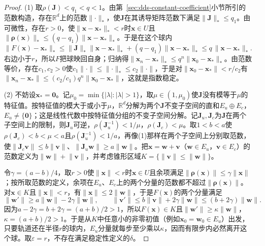 \begin{proof}
(1) 取$\rho(\bm J)<q_1<q<1$。由第~\ref{sec:dds-constant-coefficient}小节所引的范数构造，存在$\mathbb R^d$上的范数$\lVert\cdot\rVert_*$，使$\bm J$在其诱导矩阵范数下满足$\lVert\bm J\rVert_*\leq q_1$。由可微性，存在$r>0$，使$\lVert\bm x-\bm x_*\rVert_*<r$时$\bm x\in U$且$\lVert\bm\rho(\bm x)\rVert_*\leq(q-q_1)\lVert\bm x-\bm x_*\rVert_*$。于是在这个球内
\[
  \lVert F(\bm x)-\bm x_*\rVert_*\leq\lVert\bm J\rVert_*\lVert\bm x-\bm x_*\rVert_*+(q-q_1)\lVert\bm x-\bm x_*\rVert_*\leq q\,\lVert\bm x-\bm x_*\rVert_*.
\]
右边小于$r$，所以$F$把球映回自身；归纳得$\lVert\bm x_n-\bm x_*\rVert_*\leq q^n\lVert\bm x_0-\bm x_*\rVert_*$。由范数等价，存在$c_1,c_2>0$使$c_1\lVert\cdot\rVert\leq\lVert\cdot\rVert_*\leq c_2\lVert\cdot\rVert$，于是对$\lVert\bm x_0-\bm x_*\rVert<r/c_2$有$\lVert\bm x_n-\bm x_*\rVert\leq(c_2/c_1)q^n\lVert\bm x_0-\bm x_*\rVert$，这就是指数稳定。

(2) 不妨设$\bm x_*=\bm 0$。记$\mu_0=\min\{|\lambda|:|\lambda|>1\}$，取$\mu\in(1,\mu_0)$使$\bm J$没有模等于$\mu$的特征值。按特征值的模大于或小于$\mu$，$\mathbb R^d$分解为两个$\bm J$不变子空间的直和$E_u\oplus E_c$，$E_u\neq\{\bm 0\}$；这是线性代数中按特征值分组的不变子空间分解。记$\bm J_u,\bm J_c$为$\bm J$在两个子空间上的限制，则$\bm J_u$可逆，$\rho(\bm J_u^{-1})<1/\mu$，$\rho(\bm J_c)<\mu$。取$1<b<a$使$\rho(\bm J_c)<b<\mu<a$且$\rho(\bm J_u^{-1})<1/a$，再像(1)那样在两个子空间上分别取范数，使$\lVert\bm J_c\bm v\rVert\leq b\lVert\bm v\rVert$、$\lVert\bm J_u\bm w\rVert\geq a\lVert\bm w\rVert$。把$\bm x=\bm w+\bm v$（$\bm w\in E_u$，$\bm v\in E_c$）的范数定义为$\lVert\bm w\rVert+\lVert\bm v\rVert$，并考虑锥形区域$K=\{\lVert\bm v\rVert\leq\lVert\bm w\rVert\}$。

令$\gamma=(a-b)/4$，取$r>0$使$\lVert\bm x\rVert<r$时$\bm x\in U$且余项满足$\lVert\bm\rho(\bm x)\rVert\leq\gamma\lVert\bm x\rVert$；按所取范数的定义，余项在$E_u$、$E_c$上的两个分量的范数都不超过$\lVert\bm\rho(\bm x)\rVert$。对$\bm x\in K$且$\lVert\bm x\rVert<r$，有$\lVert\bm x\rVert\leq2\lVert\bm w\rVert$，于是$F(\bm x)$的两个分量满足
\[
  \lVert\bm w'\rVert\geq a\lVert\bm w\rVert-2\gamma\lVert\bm w\rVert,\qquad
  \lVert\bm v'\rVert\leq b\lVert\bm v\rVert+2\gamma\lVert\bm w\rVert\leq(b+2\gamma)\lVert\bm w\rVert .
\]
因为$a-2\gamma=b+2\gamma=(a+b)/2>1$，所以$F(\bm x)\in K$且$\lVert\bm w'\rVert\geq\kappa\lVert\bm w\rVert$，$\kappa=(a+b)/2>1$。于是从$K$中任意小的非零初值（例如$\bm x_0=\bm w_0\in E_u$）出发，只要轨道还在半径$r$的球内，$E_u$分量就每步至少乘以$\kappa$，因而有限步内必然离开这个球。取$\varepsilon=r$，不存在满足稳定性定义的$\delta$。
\end{proof}

